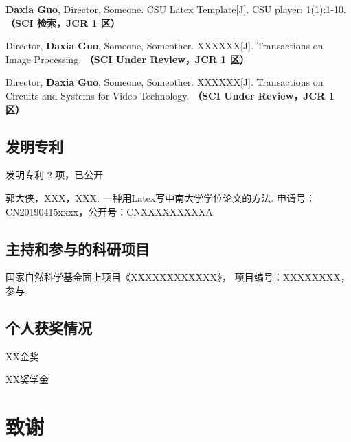 \else
\begin{enumerate}[label={[\arabic*]}]
\item \textbf{Daxia Guo}, Director, Someone. CSU Latex Template[J]. CSU player: 1(1):1-10. {\bfseries \heiti（SCI 检索，JCR 1 区）}
\item Director, \textbf{Daxia Guo}, Someone, Someother. XXXXXX[J]. Transactions on Image Processing. {\bfseries \heiti（SCI Under Review，JCR 1 区）}
\item Director, \textbf{Daxia Guo}, Someone, Someother. XXXXXX[J]. Transactions on Circuits and Systems for Video Technology. {\bfseries \heiti（SCI Under Review，JCR 1 区）}
\end{enumerate}
\fi
\subsection*{发明专利}
\ifblindreview
\noindent
发明专利 2 项，已公开
\else
\begin{enumerate}[label={[\arabic*]}]
\item 郭大侠，XXX，XXX. 一种用Latex写中南大学学位论文的方法. 申请号：CN20190415xxxx，公开号：CNXXXXXXXXXA
\end{enumerate}
\fi

\ifblindreview
\else
\subsection*{主持和参与的科研项目}
\begin{enumerate}[label={[\arabic*]}]
\item 国家自然科学基金面上项目《XXXXXXXXXXXX》， 项目编号：XXXXXXXX，参与.
\end{enumerate}

\subsection*{个人获奖情况}
\noindent
\begin{enumerate}[label={[\arabic*]}]
\item XX金奖
\item XX奖学金
\end{enumerate}
\fi

\newpage

\ifblindreview
\else
\section{致谢} %
\lipsum
\newpage
\fi